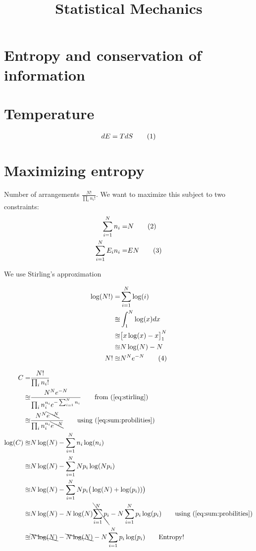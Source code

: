 \documentclass[]{article}
\title{Statistical Mechanics}
\author{}
\newcommand\numberthis{\addtocounter{equation}{1}\tag{\theequation}}
\begin{document}
\maketitle

\begin{abstract}

\end{abstract}

\tableofcontents

\section{Entropy and conservation of information}
\section{Temperature}
\begin{align*}
dE = T dS \numberthis \label{eq:T}
\end{align*}
\section{Maximizing entropy}


Number of arrangements $\frac{N!}{\prod_{i}n_i!}$. We want to maximize this subject to two constraints:
\begin{align*}
\sum_{i=1}^{N} n_i =& N \numberthis\label{eq:sum:probilities}\\
\sum_{i=1}^{N} E_i n_i =& E N \numberthis\label{eq:total:energy}
\end{align*}

We use Stirling's approximation

\begin{align*}
\log(N!) =& \sum_{i=1}^{N}\log (i)\\
\approxeq &\int_{1}^{N} \log(x) dx\\
\approxeq& \big[x \log(x) - x \big]_1^N\\
\approxeq& N\log(N)-N\\
N! \approxeq& N^N e^{-N}\numberthis\label{eq:stirling}
\end{align*}

\begin{align*}
C=&\frac{N!}{\prod_{i}n_i!}\\
 \approxeq& \frac{N^N e^{-N}}{\prod_{i}n_i^{n_i} e^{-\sum_{i=1}^{N}n_i}}\tag*{from (\ref{eq:stirling})}\\
\approxeq& \frac{N^N \bcancel{e^{-N}}}{\prod_{i}n_i^{n_i} \bcancel{e^{-N}}}\tag*{using (\ref{eq:sum:probilities})}\\
\log(C) \approxeq & N \log(N) - \sum_{i=1}^{N} n_i \log(n_i)\\
\approxeq& N \log(N) - \sum_{i=1}^{N} N p_i \log(N p_i)\\
\approxeq& N \log(N) - \sum_{i=1}^{N} N p_i \big(\log(N) + \log(p_i))\big)\\
\approxeq& N \log(N) -  N \log(N) \bcancel{\sum_{i=1}^{N} p_i}  - N \sum_{i=1}^{N}p_i \log(p_i)\tag*{using (\ref{eq:sum:probilities})}\\
\approxeq& \bcancel{N \log(N)} - \bcancel{N \log(N)}  - N \sum_{i=1}^{N}p_i \log(p_i)\tag*{Entropy!}
\end{align*}
\end{document}
